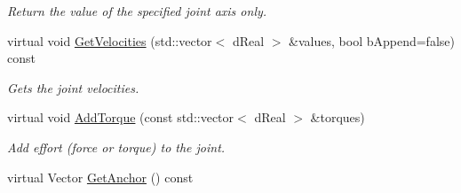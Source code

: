 \begin{DoxyCompactItemize}
\begin{DoxyCompactList}\small\item\em Return the value of the specified joint axis only. \item\end{DoxyCompactList}\item 
virtual void \hyperlink{classOpenRAVE_1_1KinBody_1_1Joint_acf2184aef9396b8b098871e1a040ff77}{GetVelocities} (std::vector$<$ dReal $>$ \&values, bool bAppend=false) const 
\begin{DoxyCompactList}\small\item\em Gets the joint velocities. \item\end{DoxyCompactList}\item 
\hypertarget{classOpenRAVE_1_1KinBody_1_1Joint_a163d3455185c5ea511f74c790056b5ff}{
virtual void \hyperlink{classOpenRAVE_1_1KinBody_1_1Joint_a163d3455185c5ea511f74c790056b5ff}{AddTorque} (const std::vector$<$ dReal $>$ \&torques)}
\label{classOpenRAVE_1_1KinBody_1_1Joint_a163d3455185c5ea511f74c790056b5ff}

\begin{DoxyCompactList}\small\item\em Add effort (force or torque) to the joint. \item\end{DoxyCompactList}\item 
\hypertarget{classOpenRAVE_1_1KinBody_1_1Joint_ab2179b392d53650660c9ab35c16bc4fb}{
virtual Vector \hyperlink{classOpenRAVE_1_1KinBody_1_1Joint_ab2179b392d53650660c9ab35c16bc4fb}{GetAnchor} () const }
\label{classOpenRAVE_1_1KinBody_1_1Joint_ab2179b392d53650660c9ab35c16bc4fb}


\end{DoxyCompactItemize}
